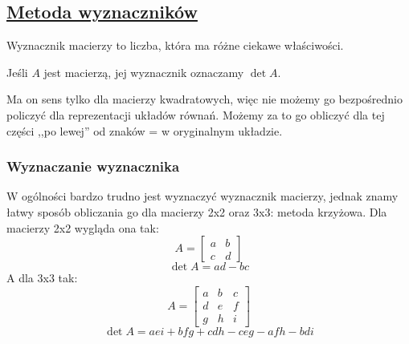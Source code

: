 \documentclass{article}
\theoremstyle{remark}
\begin{document}
\subsection{\texorpdfstring{\ul{Metoda wyznaczników}}{Metoda wyznaczników}}
Wyznacznik macierzy to liczba, która ma różne ciekawe właściwości.

Jeśli $A$ jest macierzą, jej wyznacznik oznaczamy $\det A$.

Ma on sens tylko dla macierzy kwadratowych, więc nie możemy go bezpośrednio policzyć
dla reprezentacji układów równań. Możemy za to go obliczyć dla tej części ,,po lewej''
od znaków = w oryginalnym układzie.

\subsubsection{Wyznaczanie wyznacznika}
W ogólności bardzo trudno jest wyznaczyć wyznacznik macierzy, jednak znamy łatwy
sposób obliczania go dla macierzy 2x2 oraz 3x3: metoda krzyżowa.
Dla macierzy 2x2 wygląda ona tak:
\[A=\left[
  \begin{array}{ll}
    a&b\\
    c&d
  \end{array}
\right]\]\[ \det A=ad-bc \]
A dla 3x3 tak:
\[A=\left[
  \begin{array}{lll}
    a&b&c\\
    d&e&f\\
    g&h&i
  \end{array}
\right]\]\[ \det A=aei+bfg+cdh-ceg-afh-bdi\]
\end{document}
